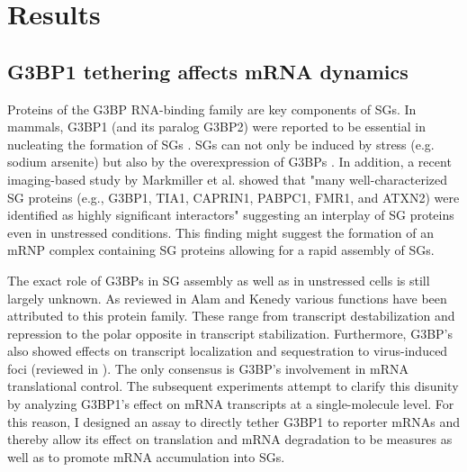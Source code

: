 \chapter{Results}


\section{G3BP1 tethering affects mRNA dynamics}

Proteins of the G3BP RNA-binding family are key components of SGs.
In mammals, G3BP1 (and its paralog G3BP2) were reported to be essential in nucleating the formation of SGs \cite{kedersha_g3bp-caprin1-usp10_2016}.
SGs can not only be induced by stress (e.g. sodium arsenite) but also by the overexpression of G3BPs \cite{tourriere_rasgap-associated_2003}.
In addition, a recent imaging-based study by Markmiller et al. \cite{markmiller_context-dependent_2018} showed that "many well-characterized SG proteins (e.g., G3BP1, TIA1, CAPRIN1, PABPC1, FMR1, and ATXN2) were identified as highly significant interactors" suggesting an interplay of SG proteins even in unstressed conditions.
This finding might suggest the formation of an mRNP complex containing SG proteins allowing for a rapid assembly of SGs.

The exact role of G3BPs in SG assembly as well as in unstressed cells is still largely unknown.
As reviewed in Alam and Kenedy \cite{alam_rasputin_2019} various functions have been attributed to this protein family.
These range from transcript destabilization and repression to the polar opposite in transcript stabilization.
Furthermore, G3BP's also showed effects on transcript localization and sequestration to virus-induced foci (reviewed in \cite{zhang_chronic_2019}).
The only consensus is G3BP's involvement in mRNA translational control.
The subsequent experiments attempt to clarify this disunity by analyzing G3BP1's effect on mRNA transcripts at a single-molecule level.
For this reason, I designed an assay to directly tether G3BP1 to reporter mRNAs and thereby  allow its effect on translation and mRNA degradation to be measures as well as to promote mRNA accumulation into SGs.

